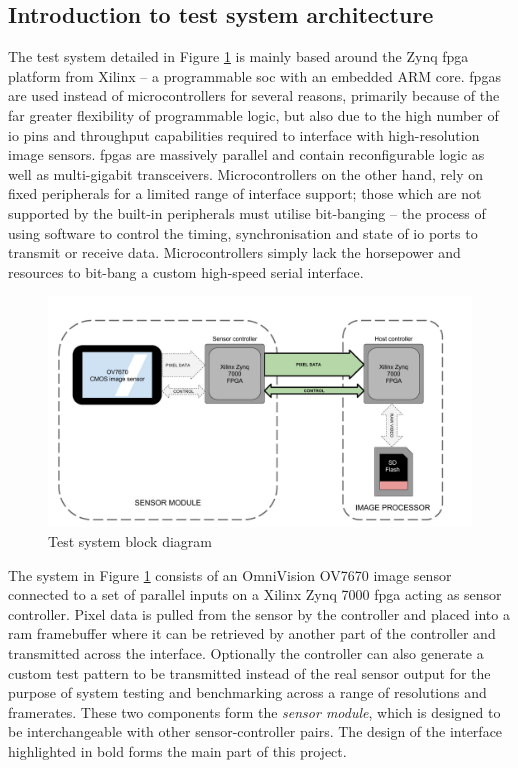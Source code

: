 \documentclass[a4paper]{report}
\begin{document}
\subsection{Introduction to test system architecture}

The test system detailed in Figure \ref{fig:block_diagram_overview} is mainly based around the Zynq \gls{fpga} platform from Xilinx -- a programmable \gls{soc} with an embedded ARM core. \Glspl{fpga} are used instead of microcontrollers for several reasons, primarily because of the far greater flexibility of programmable logic, but also due to the high number of \gls{io} pins and throughput capabilities required to interface with high-resolution image sensors. \Glspl{fpga} are massively parallel and contain reconfigurable logic as well as multi-gigabit transceivers. Microcontrollers on the other hand, rely on fixed peripherals for a limited range of interface support; those which are not supported by the built-in peripherals must utilise bit-banging -- the process of using software to control the timing, synchronisation and state of \gls{io} ports to transmit or receive data. Microcontrollers simply lack the horsepower and resources to bit-bang a custom high-speed serial interface.

\begin{figure}
  \centering
  \includegraphics[width=1\textwidth]{block_diagram_overview.png}
  \caption{Test system block diagram}
  \label{fig:block_diagram_overview}
\end{figure}

The system in Figure \ref{fig:block_diagram_overview} consists of an OmniVision OV7670 image sensor connected to a set of parallel inputs on a Xilinx Zynq 7000 \gls{fpga} acting as sensor controller. Pixel data is pulled from the sensor by the controller and placed into a \gls{ram} framebuffer where it can be retrieved by another part of the controller and transmitted across the interface. Optionally the controller can also generate a custom test pattern to be transmitted instead of the real sensor output for the purpose of system testing and benchmarking across a range of resolutions and framerates. These two components form the \textit{sensor module}, which is designed to be interchangeable with other sensor-controller pairs. The design of the interface highlighted in bold forms the main part of this project. 
\end{document}
